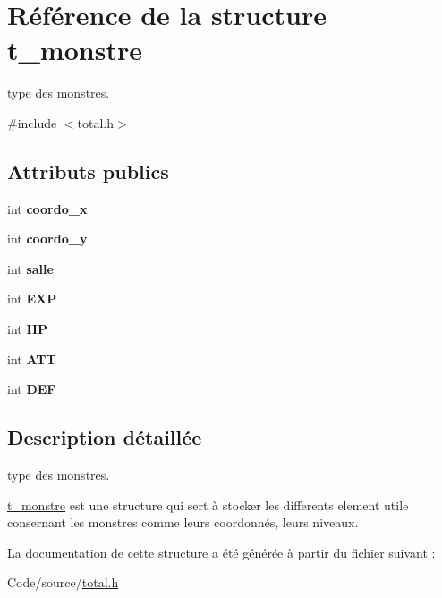 \hypertarget{structt__monstre}{}\section{Référence de la structure t\+\_\+monstre}
\label{structt__monstre}


type des monstres.  




{\ttfamily \#include $<$total.\+h$>$}

\subsection*{Attributs publics}
\begin{DoxyCompactItemize}
\item 
int {\bfseries coordo\+\_\+x}\hypertarget{structt__monstre_a42819071d12918855eda37dd9d05a587}{}\label{structt__monstre_a42819071d12918855eda37dd9d05a587}

\item 
int {\bfseries coordo\+\_\+y}\hypertarget{structt__monstre_a383ff5a904ebc0f98bdab99293c97199}{}\label{structt__monstre_a383ff5a904ebc0f98bdab99293c97199}

\item 
int {\bfseries salle}\hypertarget{structt__monstre_ad45c60cbcf47e11e06f82d9ebf4900ad}{}\label{structt__monstre_ad45c60cbcf47e11e06f82d9ebf4900ad}

\item 
int {\bfseries E\+XP}\hypertarget{structt__monstre_a18e858f4e45b07e77c6ecbdf75a099e2}{}\label{structt__monstre_a18e858f4e45b07e77c6ecbdf75a099e2}

\item 
int {\bfseries HP}\hypertarget{structt__monstre_a1c4c4424d4d5ff449c5e2a1c2752670a}{}\label{structt__monstre_a1c4c4424d4d5ff449c5e2a1c2752670a}

\item 
int {\bfseries A\+TT}\hypertarget{structt__monstre_a42bf712bc741f80355f81ce421f83bb2}{}\label{structt__monstre_a42bf712bc741f80355f81ce421f83bb2}

\item 
int {\bfseries D\+EF}\hypertarget{structt__monstre_ae77a0567bdf7c7eb72a5a30a3cdd438f}{}\label{structt__monstre_ae77a0567bdf7c7eb72a5a30a3cdd438f}

\end{DoxyCompactItemize}


\subsection{Description détaillée}
type des monstres. 

\hyperlink{structt__monstre}{t\+\_\+monstre} est une structure qui sert à stocker les differents element utile consernant les monstres comme leurs coordonnés, leurs niveaux. 

La documentation de cette structure a été générée à partir du fichier suivant \+:\begin{DoxyCompactItemize}
\item 
Code/source/\hyperlink{total_8h}{total.\+h}\end{DoxyCompactItemize}
